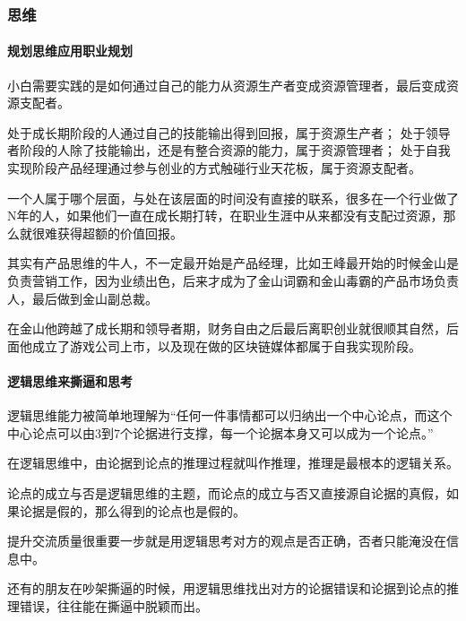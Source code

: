 \documentclass[letterpaper,10pt,english]{sphinxmanual}
\begin{document}
\subsubsection{思维}
\label{\detokenize{chapter_idea/idea:id1}}\label{\detokenize{chapter_idea/idea::doc}}

\paragraph{规划思维应用职业规划}
\label{\detokenize{chapter_idea/idea:id2}}
小白需要实践的是如何通过自己的能力从资源生产者变成资源管理者，最后变成资源支配者。
%
\begin{footnote}[370]\sphinxAtStartFootnote
{}
%
\end{footnote}

处于成长期阶段的人通过自己的技能输出得到回报，属于资源生产者；
处于领导者阶段的人除了技能输出，还是有整合资源的能力，属于资源管理者；
处于自我实现阶段产品经理通过参与创业的方式触碰行业天花板，属于资源支配者。

一个人属于哪个层面，与处在该层面的时间没有直接的联系，很多在一个行业做了N年的人，如果他们一直在成长期打转，在职业生涯中从来都没有支配过资源，那么就很难获得超额的价值回报。

其实有产品思维的牛人，不一定最开始是产品经理，比如王峰最开始的时候金山是负责营销工作，因为业绩出色，后来才成为了金山词霸和金山毒霸的产品市场负责人，最后做到金山副总裁。

在金山他跨越了成长期和领导者期，财务自由之后最后离职创业就很顺其自然，后面他成立了游戏公司上市，以及现在做的区块链媒体都属于自我实现阶段。


\paragraph{逻辑思维来撕逼和思考}
\label{\detokenize{chapter_idea/idea:id3}}
逻辑思维能力被简单地理解为“任何一件事情都可以归纳出一个中心论点，而这个中心论点可以由3到7个论据进行支撑，每一个论据本身又可以成为一个论点。”

在逻辑思维中，由论据到论点的推理过程就叫作推理，推理是最根本的逻辑关系。

论点的成立与否是逻辑思维的主题，而论点的成立与否又直接源自论据的真假，如果论据是假的，那么得到的论点也是假的。

提升交流质量很重要一步就是用逻辑思考对方的观点是否正确，否者只能淹没在信息中。

还有的朋友在吵架撕逼的时候，用逻辑思维找出对方的论据错误和论据到论点的推理错误，往往能在撕逼中脱颖而出。
\end{document}
